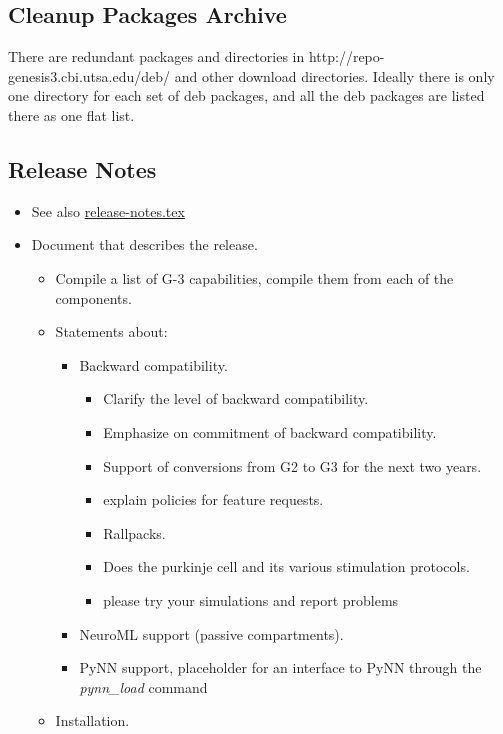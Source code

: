 \documentclass[12pt]{article}
\begin{document}
\subsection{Cleanup Packages Archive}

There are redundant packages and directories in
http://repo-genesis3.cbi.utsa.edu/deb/ and other download directories.
Ideally there is only one directory for each set of deb packages, and
all the deb packages are listed there as one flat list.


\subsection{Release Notes}

\begin{itemize}
\item See also \href{../release-notes/release-notes.tex}{release-notes.tex}
\item Document that describes the release.
  \begin{itemize}
  \item Compile a list of G-3 capabilities, compile them from each of the components.
  \item Statements about:
    \begin{itemize}
    \item Backward compatibility.
      \begin{itemize}
      \item Clarify the level of backward compatibility. 
      \item Emphasize on commitment of backward compatibility.
      \item Support of conversions from G2 to G3 for the next two years.
      \item explain policies for feature requests.
      \item Rallpacks.
      \item Does the purkinje cell and its various stimulation protocols.
      \item please try your simulations and report problems
      \end{itemize}
    \item NeuroML support (passive compartments).
    \item PyNN support, placeholder for an interface to PyNN through the
      {\it pynn\_load} command
    \end{itemize}
  \item Installation.
    \begin{itemize}

\end{itemize}
\end{itemize}
\end{itemize}
\end{document}
